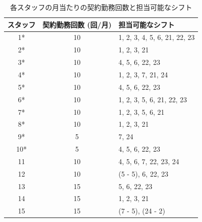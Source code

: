 \documentclass[11pt]{jsarticle}
\begin{document}
\begin{table}[htb]
	\begin{center}
    \caption{各スタッフの月当たりの契約勤務回数と担当可能なシフト}
    \begin{tabular}{ccl}
      \hline \hline
      スタッフ & 契約勤務回数 (回/月) & 担当可能なシフト \\ \hline
      1* & 10 & 1, 2, 3, 4, 5, 6, 21, 22, 23 \\
      2* & 10 & 1, 2, 3, 21 \\
      3* & 10 & 4, 5, 6, 22, 23 \\
      4* & 10 & 1, 2, 3, 7, 21, 24 \\
      5* & 10 & 4, 5, 6, 22, 23 \\
      6* & 10 & 1, 2, 3, 5, 6, 21, 22, 23 \\
      7* & 10 & 1, 2, 3, 5, 6, 21 \\
      8* & 10 & 1, 2, 3, 21 \\
      9* & 5 & 7, 24 \\
      10* & 5 & 4, 5, 6, 22, 23 \\
      11 & 10 & 4, 5, 6, 7, 22, 23, 24 \\
      12 & 10 & (5 - 5), 6, 22, 23 \\
      13 & 15 & 5, 6, 22, 23 \\
      14 & 15 & 1, 2, 3, 21 \\
      15 & 15 & (7 - 5), (24 - 2) \\ \hline \hline
    \end{tabular}
    \label{tab:staff_skill_contract}
  \end{center}
\end{table}
\end{document}
